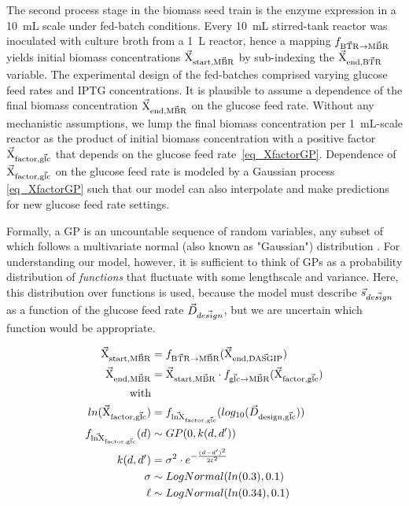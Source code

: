 \documentclass[sn-standardnature]{sn-jnl}%
\def\vec{\mathaccent "017E\relax }
\theoremstyle{thmstyleone}%
\theoremstyle{thmstyletwo}%
\theoremstyle{thmstylethree}%
\begin{document}
The second process stage in the biomass seed train is the enzyme expression in a 10~mL scale under fed-batch conditions.
Every 10~mL stirred-tank reactor was inoculated with culture broth from a 1~L reactor, hence a mapping $f_\mathrm{\vec{BTR} \rightarrow \vec{MBR}}$ yields initial biomass concentrations $\mathrm{\vec{X}_{start,\vec{MBR}}}$ by sub-indexing the $\mathrm{\vec{X}_{end,\vec{BTR}}}$ variable.
The experimental design of the fed-batches comprised varying glucose feed rates and IPTG concentrations.
It is plausible to assume a dependence of the final biomass concentration $\mathrm{\vec{X}_{end,\vec{MBR}}}$ on the glucose feed rate.
Without any mechanistic assumptions, we lump the final biomass concentration per 1~mL-scale reactor as the product of initial biomass concentration with a positive factor $\mathrm{\vec{X}_{factor,\vec{glc}}}$ that depends on the glucose feed rate~\eqref{eq_XfactorGP}.
Dependence of $\mathrm{\vec{X}_{factor,\vec{glc}}}$ on the glucose feed rate is modeled by a Gaussian process \eqref{eq_XfactorGP} such that our model can also interpolate and make predictions for new glucose feed rate settings.

Formally, a GP is an uncountable sequence of random variables, any subset of which follows a multivariate normal (also known as "Gaussian") distribution \cite{gpdefinition}.
For understanding our model, however, it is sufficient to think of GPs as a probability distribution of \textit{functions} that fluctuate with some lengthscale and variance.
Here, this distribution over functions is used, because the model must describe $\vec{s}_{\vec{design}}$ as a function of the glucose feed rate $\vec{D}_{\vec{design}}$, but we are uncertain which function would be appropriate.

\begin{equation}
\begin{aligned}
    \mathrm{\vec{X}_{start,\vec{MBR}}} &= f_\mathrm{\vec{BTR} \rightarrow \vec{MBR}}(\mathrm{\vec{X}_{end,\vec{DASGIP}}}) \\
    \mathrm{\vec{X}_{end,\vec{MBR}}} &= \mathrm{\vec{X}_{start,\vec{MBR}}} \cdot f_{\mathrm{\vec{glc} \rightarrow \vec{MBR}}}(\mathrm{\vec{X}_{factor,\vec{glc}}}) \\
    \textrm{with} \\
    ln(\mathrm{\vec{X}_{factor,\vec{glc}}}) &= f_\mathrm{\vec{lnX}_{factor,\vec{glc}}}(log_{10}(\vec{D}_\mathrm{design,\vec{glc}})) \\
    f_\mathrm{\vec{lnX}_{factor,\vec{glc}}}(d) &\sim GP(0, k(d,d')) \\
    k(d,d') &= \sigma^2 \cdot e^{-\frac{(d-d')^2}{2\ell^2}} \\
    \sigma &\sim LogNormal(ln(0.3), 0.1) \\
    \ell &\sim LogNormal(ln(0.34), 0.1)
\end{aligned}
\label{eq_XfactorGP}
\end{equation}
\end{document}
